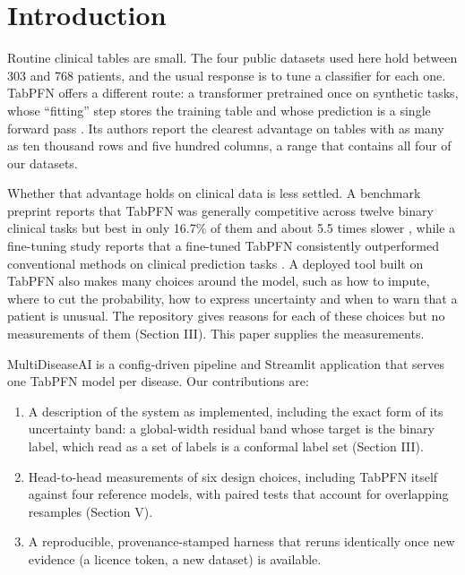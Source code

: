 \documentclass[conference]{IEEEtran}
\begin{document}
\section{Introduction}

Routine clinical tables are small. The four public datasets used here hold between 303 and 768 patients, and the usual response is to tune a classifier for each one. TabPFN offers a different route: a transformer pretrained once on synthetic tasks, whose ``fitting'' step stores the training table and whose prediction is a single forward pass \cite{hollmann2025}. Its authors report the clearest advantage on tables with as many as ten thousand rows and five hundred columns, a range that contains all four of our datasets.

Whether that advantage holds on clinical data is less settled. A benchmark preprint reports that TabPFN was generally competitive across twelve binary clinical tasks but best in only 16.7\% of them and about 5.5 times slower \cite{clinbench2026}, while a fine-tuning study reports that a fine-tuned TabPFN consistently outperformed conventional methods on clinical prediction tasks \cite{ehrsmall2026}. A deployed tool built on TabPFN also makes many choices around the model, such as how to impute, where to cut the probability, how to express uncertainty and when to warn that a patient is unusual. The repository gives reasons for each of these choices but no measurements of them (Section III). This paper supplies the measurements.

MultiDiseaseAI is a config-driven pipeline and Streamlit application that serves one TabPFN model per disease. Our contributions are:

\begin{enumerate}

\item A description of the system as implemented, including the exact form of its uncertainty band: a global-width residual band whose target is the binary label, which read as a set of labels is a conformal label set (Section III).

\item Head-to-head measurements of six design choices, including TabPFN itself against four reference models, with paired tests that account for overlapping resamples (Section V).

\item A reproducible, provenance-stamped harness that reruns identically once new evidence (a licence token, a new dataset) is available.

\end{enumerate}
\end{document}
